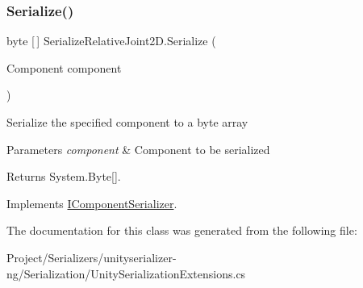 \subsubsection{\texorpdfstring{Serialize()}{Serialize()}}
{\footnotesize\ttfamily byte \mbox{[}$\,$\mbox{]} Serialize\+Relative\+Joint2\+D.\+Serialize (\begin{DoxyParamCaption}\item[{Component}]{component }\end{DoxyParamCaption})\hspace{0.3cm}{\ttfamily [inline]}}



Serialize the specified component to a byte array 


\begin{DoxyParams}{Parameters}
{\em component} & Component to be serialized\\
\hline
\end{DoxyParams}
\begin{DoxyReturn}{Returns}
System.\+Byte\mbox{[}\mbox{]}.
\end{DoxyReturn}


Implements \hyperlink{interface_i_component_serializer_ab2aa38005665496b62d6c54b5f0dbd31}{I\+Component\+Serializer}.



The documentation for this class was generated from the following file\+:\begin{DoxyCompactItemize}
\item 
Project/\+Serializers/unityserializer-\/ng/\+Serialization/Unity\+Serialization\+Extensions.\+cs\end{DoxyCompactItemize}
